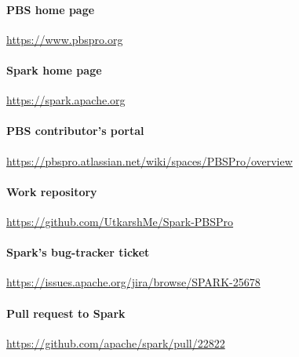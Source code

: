 
\paragraph{PBS home page}
\url{https://www.pbspro.org}

\paragraph{Spark home page}
\url{https://spark.apache.org}

\paragraph{PBS contributor's portal}
\url{https://pbspro.atlassian.net/wiki/spaces/PBSPro/overview}

\paragraph{Work repository}
\url{https://github.com/UtkarshMe/Spark-PBSPro}

\paragraph{Spark's bug-tracker ticket}
\url{https://issues.apache.org/jira/browse/SPARK-25678}

\paragraph{Pull request to Spark}
\url{https://github.com/apache/spark/pull/22822}
